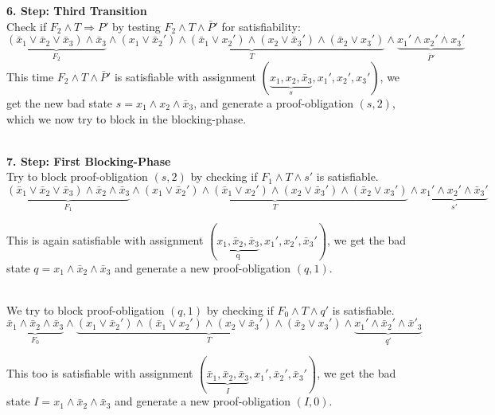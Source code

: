 \documentclass[11pt, a4paper, BCOR=10mm, ngerman]{scrbook}
\begin{document}
\textbf{6. Step: Third Transition} \\ Check if $F_2 \land T \Rightarrow P'$ by testing $F_2 \land T \land \bar P'$ for satisfiability:
\begin{equation*}
\underbrace{(\bar x_1 \lor \bar x_2 \lor \bar x_3) \land \bar x_3}_{F_2} \land \underbrace{(x_1 \lor \bar x_2' ) \land ( \bar x_1 \lor x_2') \land (x_2 \lor \bar x_3') \land ( \bar x_2 \lor x_3')}_{T} \land \underbrace{x_1' \land x_2' \land x_3'}_{ \bar P'}
\end{equation*}
This time $F_2 \land T \land \bar P'$ is satisfiable with assignment $( \underbrace{x_1, x_2, \bar x_3}_{s}, x_1', x_2', x_3')$, we get the new bad state $s = x_1 \land x_2 \land \bar x_3$, and generate a proof-obligation $(s, 2)$, which we now try to block in the blocking-phase. \\ \\ \par

\textbf{7. Step: First Blocking-Phase} \\ Try to block proof-obligation $(s, 2)$ by checking if $F_1 \land T \land s'$ is satisfiable.
\begin{equation*}
\underbrace{(\bar x_1 \lor \bar x_2 \lor \bar x_3) \land \bar x_2 \land \bar x_3}_{F_1} \land \underbrace{(x_1 \lor \bar x_2' ) \land ( \bar x_1 \lor x_2') \land (x_2 \lor \bar x_3') \land ( \bar x_2 \lor x_3')}_{T} \land \underbrace{x_1' \land x_2' \land \bar x_3'}_{ s'}
\end{equation*}

This is again satisfiable with assignment $(\underbrace{x_1, \bar x_2, \bar x_3}_{\text{q}}, x_1', x_2', \bar x_3')$, we get the bad state $q = x_1 \land \bar x_2 \land \bar x_3$ and generate a new proof-obligation $(q, 1)$. \\ \\ \par

We try to block proof-obligation $(q, 1)$ by checking if $F_0 \land T \land q'$ is satisfiable.
\begin{equation*}
\underbrace{\bar x_1 \land \bar x_2 \land \bar x_3}_{F_0} \land \underbrace{(x_1 \lor \bar x_2' ) \land ( \bar x_1 \lor x_2') \land (x_2 \lor \bar x_3') \land ( \bar x_2 \lor x_3')}_{T} \land \underbrace{x_1' \land \bar x_2' \land \bar x'_3}_{ q'}
\end{equation*}

This too is satisfiable with assignment $(\underbrace{\bar x_1, \bar x_2, \bar x_3}_{I}, x_1', \bar x_2', \bar x_3')$, we get the bad state $I = x_1 \land \bar x_2 \land \bar x_3$ and generate a new proof-obligation $(I, 0)$.
\end{document}
